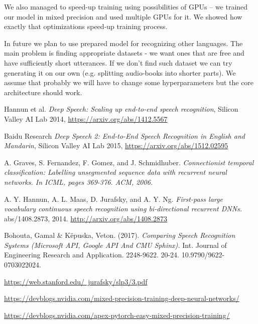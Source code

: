 \documentclass[licencjacka,en]{pracamgr}
\begin{document}
We also managed to speed-up training using possibilities of GPUs -- we trained our model in mixed precision and used multiple GPUs for it. We showed how exactly that optimizations speed-up training process.

In future we plan to use prepared model for recognizing other languages. The main problem is finding appropriate datasets - we want ones that are free and have sufficiently short utterances. If we don't find such dataset we can try generating it on our own (e.g. splitting audio-books into shorter parts). We assume that probably we will have to change some hyperparameters but the core architecture should work.

\begin{thebibliography}{99}

 Hannun et al.
\textit{Deep Speech: Scaling up end-to-end speech recognition}, Silicon Valley AI Lab 2014, \href{https://arxiv.org/abs/1412.5567}{https://arxiv.org/abs/1412.5567}

 Baidu Research \textit{Deep Speech 2: End-to-End Speech Recognition in English and Mandarin}, Silicon Valley AI Lab 2015, \href{https://arxiv.org/abs/1512.02595}{https://arxiv.org/abs/1512.02595}

 A. Graves, S. Fernandez, F. Gomez, and J. Schmidhuber. \textit{Connectionist temporal classification:
Labelling unsegmented sequence data with recurrent neural networks. In ICML, pages 369-376. ACM, 2006.}

 A. Y. Hannun, A. L. Maas, D. Jurafsky, and A. Y. Ng. \textit{First-pass large vocabulary continuous speech recognition using bi-directional recurrent DNNs.} abs/1408.2873, 2014. \href{http://arxiv.org/abs/1408.2873}{http://arxiv.org/abs/1408.2873}

 Bohouta, Gamal \& Këpuska, Veton. (2017). \textit{Comparing Speech Recognition Systems (Microsoft API, Google API And CMU Sphinx).} Int. Journal of Engineering Research and Application. 2248-9622. 20-24. 10.9790/9622-0703022024.

 \href{https://web.stanford.edu/~jurafsky/slp3/3.pdf}{https://web.stanford.edu/~jurafsky/slp3/3.pdf}

 \href{https://devblogs.nvidia.com/mixed-precision-training-deep-neural-networks/}
{https://devblogs.nvidia.com/mixed-precision-training-deep-neural-networks/}

 \href{https://devblogs.nvidia.com/apex-pytorch-easy-mixed-precision-training/}{https://devblogs.nvidia.com/apex-pytorch-easy-mixed-precision-training/}


\end{thebibliography}
\end{document}
